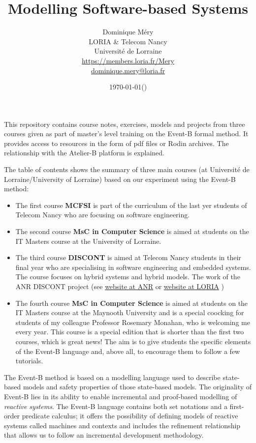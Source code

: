 \documentclass[ 12pt]{article}
\title{Modelling Software-based Systems}
\author{Dominique M\'ery\\
LORIA \& Telecom Nancy\\ Universit\'e de Lorraine\\
\url{https://members.loria.fr/Mery}\\ \url{dominique.mery@loria.fr}}
\date{\today (\now)}
\begin{document}
  \setcounter{ex}{1}
\maketitle

This repository contains course notes, exercises, models and projects
from three courses given as part of master's level training on the
Event-B formal method. It provides access to resources in the form of
pdf files or Rodin archives. The relationship with the Atelier-B
platform is explained.

The table
of contents shows the  summary of three main courses (at Université de 
 Lorraine/University of Lorraine)  based on our
experiment using the  Event-B method:
\begin{itemize}


  
\item The first course \textbf{MCFSI} is part of the curriculum of the last yer
  students of Telecom Nancy  who are  focusing on software
  engineering.
\item  The second course  \textbf{MsC in Computer Science} is aimed at students on the IT Masters course
  at the University of Lorraine.
\item  The third course \textbf{DISCONT} is aimed at Telecom Nancy students in their final year who are specialising in software engineering and embedded systems. The course focuses on hybrid systems and hybrid models. The work of the ANR DISCONT project (see 
\href{https://anr.fr/Projet-ANR-17-CE25-0005}{
   website at ANR} or  \href{https://discont.loria.fr}{  website at
   LORIA} )

 
\item The fourth course  \textbf{MsC in Computer Science} is aimed at students on the IT Masters course 
  at the Maynooth  University   and is a special coocking for students 
  of my colleague Professor Rosemary Monahan, who is welcoming me every 
  year. This course is a special edition that is shorter than the first two courses, which is great news! The aim is to give students the specific elements of the Event-B language and, above all, to encourage them to follow a few tutorials.  

 \end{itemize}



  The Event-B  method is based on a modelling
 language used to describe state-based models and  safety
 properties of those state-based models.  The originality of  Event-B
 lies in its ability  to
 enable incremental and proof-based modelling of \textit{reactive
   systems}. The  Event-B   language contains both set notations and a
 first-order predicate calculus; it offers the possibility of defining
 models of reactive systems called machines and contexts and includes
  the refinement relationship that allows us to follow an incremental
  development methodology.  
\end{document}
